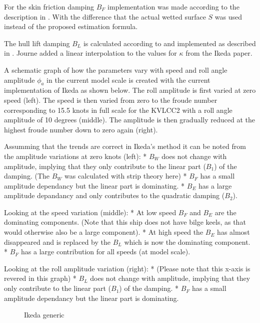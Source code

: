 For the skin friction damping \(B_F\) implementation was made according
to the description in \cite{7505983/UGK6YEVD}. With the difference that
the actual wetted surface \(S\) was used instead of the proposed
estimation formula.

The hull lift damping \(B_L\) is calculated according to
\cite{7505983/937PN5DT} and implemented as described in
\cite{7505983/UYUAYY7E}. Journe added a linear interpolation to the
values for \(\kappa\) from the Ikeda paper.

A schematic graph of how the parameters vary with speed and roll angle
amplitude \(\phi_a\) in the current model scale is created with the
current implementation of Ikeda as shown below. The roll amplitude is
first varied at zero speed (left). The speed is then varied from zero to
the froude number corresponding to 15.5 knots in full scale for the
KVLCC2 with a roll angle amplitude of 10 degrees (middle). The amplitude
is then gradually reduced at the highest froude number down to zero
again (right).

Assumming that the trends are correct in Ikeda's method it can be noted
from the amplitude variations at zero knots (left): * \(B_W\) does not
change with amplitude, implying that they only contribute to the linear
part (\(B_1\)) of the damping. (The \(B_W\) was calculated with strip
theory here) * \(B_F\) has a small amplitude dependancy but the linear
part is dominating. * \(B_E\) has a large amplitude depandancy and only
contributes to the quadratic damping (\(B_2\))\cite{7505983/4AFVVGNT}.

Looking at the speed variation (middle): * At low speed \(B_F\) and
\(B_E\) are the dominating components. (Note that this ship does not
have bilge keels, as that would otherwise also be a large component). *
At high speed the \(B_E\) has almost disappeared and is replaced by the
\(B_L\) which is now the dominating component. * \(B_F\) has a large
contribution for all speeds (at model scale).

Looking at the roll amplitude variation (right): * (Please note that
this x-axis is revered in this graph) * \(B_L\) does not change with
amplitude, implying that they only contribute to the linear part
(\(B_1\)) of the damping. * \(B_F\) has a small amplitude dependancy but
the linear part is dominating.

    \begin{figure}
        \begin{center}\end{center}
        \caption{Ikeda generic}
        \label{fig:ikeda_generic}
    \end{figure}
    
